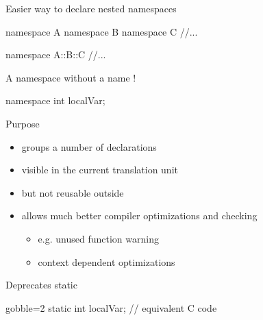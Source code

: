 \begin{frame}[fragile]
  Easier way to declare nested namespaces
  \begin{alertblock}{}
    \begin{cppcode*}{}
      namespace A {
        namespace B {
          namespace C {
            //...
          }
        }
      }
    \end{cppcode*}
  \end{alertblock}
  \begin{exampleblock}{}
    \begin{cppcode*}{}
      namespace A::B::C {
        //...
      }
    \end{cppcode*}
  \end{exampleblock}
\end{frame}

\begin{frame}[fragile]
  \begin{exampleblock}{A namespace without a name !}
    \begin{cppcode*}{}
      namespace {
        int localVar;
      }
    \end{cppcode*}
  \end{exampleblock}
  \begin{block}{Purpose}
    \begin{itemize}
    \item groups a number of declarations
    \item visible in the current translation unit
    \item but not reusable outside
    \item allows much better compiler optimizations and checking
      \begin{itemize}
      \item e.g. unused function warning
      \item context dependent optimizations
      \end{itemize}
    \end{itemize}
  \end{block}
  \begin{alertblock}{Deprecates static}
    \begin{cppcode*}{gobble=2}
      static int localVar; // equivalent C code
    \end{cppcode*}
  \end{alertblock}
\end{frame}

